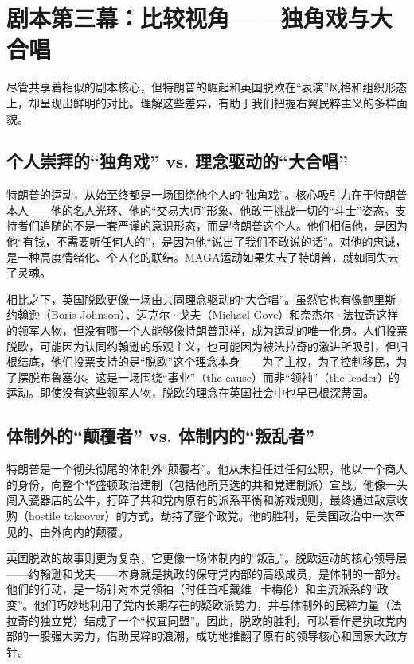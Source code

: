 \section{剧本第三幕：比较视角——独角戏与大合唱}

尽管共享着相似的剧本核心，但特朗普的崛起和英国脱欧在“表演”风格和组织形态上，却呈现出鲜明的对比。理解这些差异，有助于我们把握右翼民粹主义的多样面貌。

\subsection{个人崇拜的“独角戏” vs. 理念驱动的“大合唱”}

特朗普的运动，从始至终都是一场围绕他个人的“独角戏”。核心吸引力在于特朗普本人——他的名人光环、他的“交易大师”形象、他敢于挑战一切的“斗士”姿态。支持者们追随的不是一套严谨的意识形态，而是特朗普这个人。他们相信他，是因为他“有钱，不需要听任何人的”，是因为他“说出了我们不敢说的话”。对他的忠诚，是一种高度情绪化、个人化的联结。MAGA运动如果失去了特朗普，就如同失去了灵魂。

相比之下，英国脱欧更像一场由共同理念驱动的“大合唱”。虽然它也有像鲍里斯·约翰逊（Boris Johnson）、迈克尔·戈夫（Michael Gove）和奈杰尔·法拉奇这样的领军人物，但没有哪一个人能够像特朗普那样，成为运动的唯一化身。人们投票脱欧，可能因为认同约翰逊的乐观主义，也可能因为被法拉奇的激进所吸引，但归根结底，他们投票支持的是“脱欧”这个理念本身——为了主权，为了控制移民，为了摆脱布鲁塞尔。这是一场围绕“事业”（the cause）而非“领袖”（the leader）的运动。即使没有这些领军人物，脱欧的理念在英国社会中也早已根深蒂固。

\subsection{体制外的“颠覆者” vs. 体制内的“叛乱者”}

特朗普是一个彻头彻尾的体制外“颠覆者”。他从未担任过任何公职，他以一个商人的身份，向整个华盛顿政治建制（包括他所竞选的共和党建制派）宣战。他像一头闯入瓷器店的公牛，打碎了共和党内原有的派系平衡和游戏规则，最终通过敌意收购（hostile takeover）的方式，劫持了整个政党。他的胜利，是美国政治中一次罕见的、由外向内的颠覆。

英国脱欧的故事则更为复杂，它更像一场体制内的“叛乱”。脱欧运动的核心领导层——约翰逊和戈夫——本身就是执政的保守党内部的高级成员，是体制的一部分。他们的行动，是一场针对本党领袖（时任首相戴维·卡梅伦）和主流派系的“政变”。他们巧妙地利用了党内长期存在的疑欧派势力，并与体制外的民粹力量（法拉奇的独立党）结成了一个“权宜同盟”。因此，脱欧的胜利，可以看作是执政党内部的一股强大势力，借助民粹的浪潮，成功地推翻了原有的领导核心和国家大政方针。

